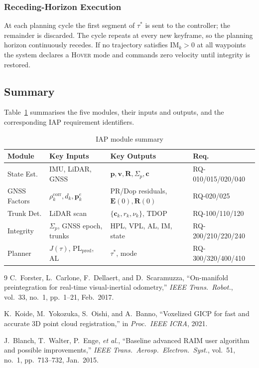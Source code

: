 \documentclass[journal]{IEEEtran}
\newcommand{\E}{\mathbf{E}}           %
\newcommand{\Rext}{\mathbf{R}}        %
\newcommand{\pe}{\mathbf{p}}
\newcommand{\ve}{\mathbf{v}}
\begin{document}
\subsubsection{Receding-Horizon Execution}

At each planning cycle the first segment of $\tau^*$ is sent to the
controller; the remainder is discarded.  The cycle repeats at every
new keyframe, so the planning horizon continuously recedes.  If no
trajectory satisfies $\mathrm{IM}_k > 0$ at all waypoints the system
declares a \textsc{Hover} mode and commands zero velocity until
integrity is restored.

\subsection{Summary}
\label{sec:summary}

Table~\ref{tab:modules} summarises the five modules, their inputs and
outputs, and the corresponding IAP requirement identifiers.

\begin{table}[ht]
\caption{IAP module summary}
\label{tab:modules}
\centering
\small
\begin{tabular}{@{}llll@{}}
\toprule
Module & Key Inputs & Key Outputs & Req. \\
\midrule
State Est.   & IMU, LiDAR, GNSS & $\pe,\ve,\mathbf{R},\Sigma_p,\mathbf{c}$ & RQ-010/015/020/040 \\
GNSS Factors & $\rho_k^{\mathrm{corr}},d_k,\mathbf{p}_k^e$ & PR/Dop residuals, $\E(0),\Rext(0)$ & RQ-020/025 \\
Trunk Det.   & LiDAR scan & $\{\mathbf{c}_k,r_k,\nu_k\}$, TDOP & RQ-100/110/120 \\
Integrity    & $\Sigma_p$, GNSS epoch, trunks & HPL, VPL, AL, IM, state & RQ-200/210/220/240 \\
Planner      & $J(\tau)$, $\mathrm{PL}_{\mathrm{pred}}$, AL & $\tau^*$, mode & RQ-300/320/400/410 \\
\bottomrule
\end{tabular}
\end{table}

\begin{thebibliography}{9}
C.~Forster, L.~Carlone, F.~Dellaert, and D.~Scaramuzza,
``On-manifold preintegration for real-time visual-inertial odometry,''
\textit{IEEE Trans.\ Robot.}, vol.~33, no.~1, pp.~1--21, Feb.\ 2017.

K.~Koide, M.~Yokozuka, S.~Oishi, and A.~Banno,
``Voxelized GICP for fast and accurate 3D point cloud registration,''
in \textit{Proc.\ IEEE ICRA}, 2021.

J.~Blanch, T.~Walter, P.~Enge, \textit{et al.},
``Baseline advanced RAIM user algorithm and possible improvements,''
\textit{IEEE Trans.\ Aerosp.\ Electron.\ Syst.}, vol.~51, no.~1,
pp.~713--732, Jan.\ 2015.
\end{thebibliography}
\end{document}
